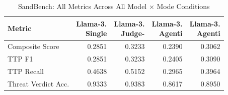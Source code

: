 \begin{table}[ht]
\centering
\caption{SandBench: All Metrics Across All Model $\times$ Mode Conditions}
\label{tab:all_conditions}
\begin{tabular}{lrrrr}
\toprule
Metric & \shortstack{Llama-3.\\Single} & \shortstack{Llama-3.\\Judge-} & \shortstack{Llama-3.\\Agenti} & \shortstack{Llama-3.\\Agenti} \\
\midrule
Composite Score & 0.2851 & 0.3233 & 0.2390 & 0.3062 \\
TTP F1 & 0.2851 & 0.3233 & 0.2405 & 0.3090 \\
TTP Recall & 0.4638 & 0.5152 & 0.2965 & 0.3964 \\
Threat Verdict Acc. & 0.9333 & 0.9383 & 0.8617 & 0.8950 \\
\bottomrule
\end{tabular}
\end{table}